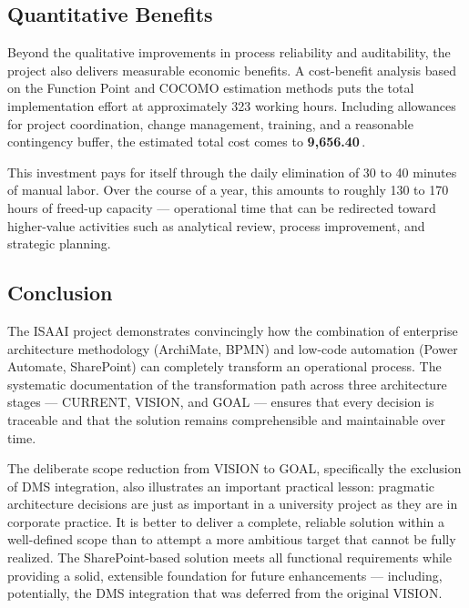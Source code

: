 \documentclass[11pt,a4paper]{article}
\begin{document}
\subsection{Quantitative Benefits}

Beyond the qualitative improvements in process reliability and auditability, the project also delivers measurable economic benefits. A cost-benefit analysis based on the Function Point and COCOMO estimation methods puts the total implementation effort at approximately 323 working hours. Including allowances for project coordination, change management, training, and a reasonable contingency buffer, the estimated total cost comes to \textbf{9,656.40\,\texteuro{}}.

This investment pays for itself through the daily elimination of 30 to 40 minutes of manual labor. Over the course of a year, this amounts to roughly 130 to 170 hours of freed-up capacity --- operational time that can be redirected toward higher-value activities such as analytical review, process improvement, and strategic planning.

\subsection{Conclusion}

The ISAAI project demonstrates convincingly how the combination of enterprise architecture methodology (ArchiMate, BPMN) and low-code automation (Power Automate, SharePoint) can completely transform an operational process. The systematic documentation of the transformation path across three architecture stages --- CURRENT, VISION, and GOAL --- ensures that every decision is traceable and that the solution remains comprehensible and maintainable over time.

The deliberate scope reduction from VISION to GOAL, specifically the exclusion of DMS integration, also illustrates an important practical lesson: pragmatic architecture decisions are just as important in a university project as they are in corporate practice. It is better to deliver a complete, reliable solution within a well-defined scope than to attempt a more ambitious target that cannot be fully realized. The SharePoint-based solution meets all functional requirements while providing a solid, extensible foundation for future enhancements --- including, potentially, the DMS integration that was deferred from the original VISION.


\end{document}
